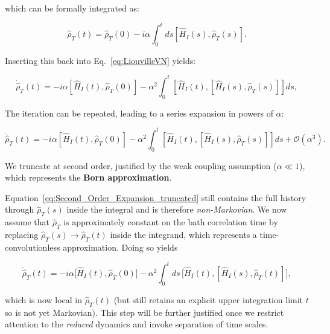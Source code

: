 \noindent
which can be formally integrated as:

\begin{equation}
	\hat{\rho}_T(t) = \hat{\rho}_T(0) - i \alpha \int_0^t ds [\hat{H}_I(s), \hat{\rho}_T(s)].
	\label{eq:Formal_Integration}
\end{equation}

\noindent
Inserting this back into Eq.~\eqref{eq:LiouvilleVN} yields:

\begin{equation}
	\dot{\hat{\rho}}_T(t) = -i \alpha \left[ \hat{H}_I(t), \hat{\rho}_T(0) \right]
	- \alpha^2 \int_0^t \left[ \hat{H}_I(t), \left[ \hat{H}_I(s), \hat{\rho}_T(s) \right] \right] ds,
	\label{eq:Second_Order_Expansion}
\end{equation}

\noindent
The iteration can be repeated, leading to a series expansion in powers of $\alpha$:

\begin{equation}
	\dot{\hat{\rho}}_T(t) = -i \alpha \left[ \hat{H}_I(t), \hat{\rho}_T(0) \right]
	- \alpha^2 \int_0^t \left[ \hat{H}_I(t), \left[ \hat{H}_I(s), \hat{\rho}_T(s) \right] \right] ds + \mathcal{O} (\alpha^3).
	\label{eq:Second_Order_Expansion_truncated}
\end{equation}

\noindent
We truncate at second order, justified by the weak coupling assumption ($\alpha \ll 1$), which represents the \textbf{Born approximation}.

\noindent
Equation~\eqref{eq:Second_Order_Expansion_truncated} still contains the full history through $\hat{\rho}_T(s)$ inside the integral and is therefore \emph{non-Markovian}. We now assume that $\hat{\rho}_T$ is approximately constant on the bath correlation time by replacing $\hat{\rho}_T(s) \to \hat{\rho}_T(t)$ inside the integrand, which represents a time-convolutionless approximation. Doing so yields

\begin{equation}
	\dot{\hat{\rho}}_T(t) = -i \alpha \big[ \hat{H}_I(t), \hat{\rho}_T(0) \big]
	- \alpha^2 \int_0^t ds\, \big[ \hat{H}_I(t), [ \hat{H}_I(s), \hat{\rho}_T(t)] \big],
	\label{eq:Second_Order_Expansion_wo_third}
\end{equation}

\noindent
which is now local in $\hat{\rho}_T(t)$ (but still retains an explicit upper integration limit $t$ so is not yet Markovian). This step will be further justified once we restrict attention to the \emph{reduced} dynamics and invoke separation of time scales.

